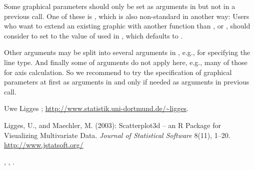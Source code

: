 \begin{Note}\relax
Some graphical parameters should only be set as arguments in
 but not in a previous  call.  One of these is
, which is also non-standard in another way: Users who
want to extend an existing  graphic with another function than
,  or , should consider to
set  to the value of  used in
, which defaults to .

Other  arguments may be split into several arguments in
, e.g., for specifying the line type.  And finally
some of  arguments do not apply here, e.g., many of those
for axis calculation.  So we recommend to try the specification of
graphical parameters at first as arguments in  and
only if needed as arguments in previous  call.
\end{Note}
\begin{Author}\relax
Uwe Ligges ;
\url{http://www.statistik.uni-dortmund.de/~ligges}.
\end{Author}
\begin{References}\relax
Ligges, U., and Maechler, M. (2003):
Scatterplot3d -- an R Package for Visualizing Multivariate Data.
\emph{Journal of Statistical Software} 8(11), 1--20.
\url{http://www.jstatsoft.org/}
\end{References}
\begin{SeeAlso}\relax
{}, , .
\end{SeeAlso}
